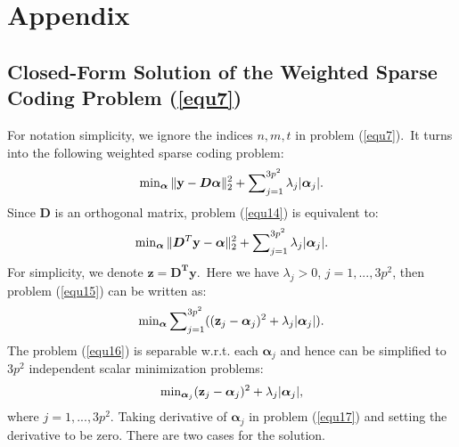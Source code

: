 %
\chapter{Appendix}
\label{sec:appendix}

\section{Closed-Form Solution of the Weighted Sparse Coding Problem (\ref{equ7})}

For notation simplicity, we ignore the indices $n,m,t$ in problem (\ref{equ7}).\ It turns into the following weighted sparse coding problem:
\vspace{-5mm}
\begin{equation}\label{equ14}
\vspace{-2mm}
\min\nolimits_{\bm{\alpha}}\|\mathbf{y}-\bm{D}\bm{\alpha}\|_{2}^{2}+\sum\nolimits_{j=1}^{3p^2}\lambda_{j}|\bm{\alpha}_{j}|.
\end{equation}
Since $\bm{D}$ is an orthogonal matrix, problem (\ref{equ14}) is equivalent to:
\vspace{-2mm}
\begin{equation}\label{equ15}
\vspace{-2mm}
\min\nolimits_{\bm{\alpha}}\|\bm{D}^{T}\mathbf{y}-\bm{\alpha}\|_{2}^{2}+\sum\nolimits_{j=1}^{3p^2}\lambda_{j}|\bm{\alpha}_{j}|.
\end{equation}
For simplicity, we denote $\mathbf{z} = \mathbf{D^{T}y}$.\ Here we have $\lambda_{j}>0$, $j=1,...,3p^2$, then problem (\ref{equ15}) can be written as:
\vspace{-2mm}
\begin{equation}\label{equ16}
\vspace{-2mm}
\min\nolimits_{\boldsymbol{\alpha}}\sum\nolimits_{j=1}^{3p^2}((\mathbf{z}_{j}-\bm{\alpha}_{j})^{2}+\lambda_{j}|\bm{\alpha}_{j}|).
\end{equation}
The problem (\ref{equ16}) is separable w.r.t. each $\bm{\alpha}_{j}$ and hence can be simplified to $3p^2$ independent scalar minimization problems:
\vspace{-2mm}
\begin{equation}\label{equ17}
\vspace{-2mm}
\min\nolimits_{\bm{\alpha}_{j}}(\mathbf{z}_{j}-\bm{\alpha}_{j})^{2}+\lambda_{j}|\bm{\alpha}_{j}|,
\end{equation}
where $j=1,...,3p^2$. Taking derivative of $\boldsymbol{\alpha}_{j}$ in problem (\ref{equ17}) and setting the derivative to be zero. There are two cases for the solution.

